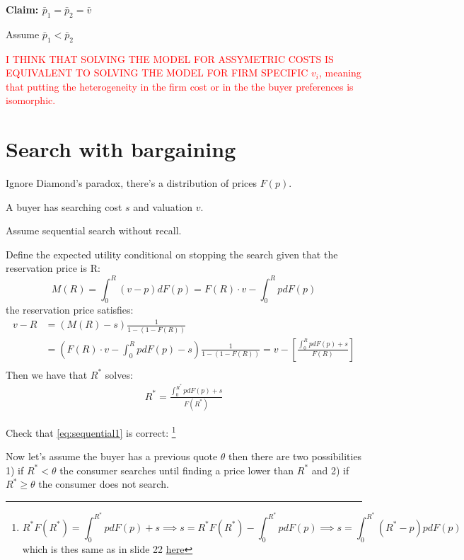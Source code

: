 \documentclass[12pt]{article}
\theoremstyle{plain}
\theoremstyle{plain}
\begin{document}
\vspace{2cm}

\textbf{Claim: $\bar{p}_1 =\bar{p}_2 =\bar{v}$ } 

Assume $\bar{p}_1 < \bar{p}_2$

\textcolor{red}{I THINK THAT SOLVING THE MODEL FOR ASSYMETRIC COSTS IS EQUIVALENT TO SOLVING THE MODEL FOR FIRM SPECIFIC $v_i$, meaning that putting the heterogeneity in the firm cost or in the the buyer preferences is isomorphic. }


\newpage 

\section{Search with bargaining}

Ignore Diamond's paradox, there's a distribution of prices $F(p)$. 

A buyer has searching cost $s$ and valuation $v$. 

Assume sequential search without recall. 

Define the expected utility conditional on stopping the search given that the reservation price is R: 
$$M(R) = \int_0^R (v-p)dF(p) = F(R)\cdot v - \int_0^R pdF(p)$$ 
the reservation price satisfies: 
\begin{align*}
        v-R &= (M(R)-s)\frac{1}{1-(1-F(R))} \\
   &= \left(F(R)\cdot v - \int_0^R pdF(p)-s\right)\frac{1}{1-(1-F(R))} = v - \left[\frac{\int_0^R pdF(p)+s}{F(R)}\right]\\
\end{align*}
Then we have that $R^*$ solves: 
\begin{align}\label{eq:sequential1}
        R^* = \frac{\int_0^{R^*} pdF(p)+s}{F(R^*)}
\end{align}

Check that \ref{eq:sequential1} is correct: 
\footnote{$$  R^*F(R^*) =  \int_0^{R^*} pdF(p)+s \implies s= R^*F(R^*) - \int_0^{R^*} pdF(p) \implies s= \int_0^{R^*} (R^*- p)  pdF(p) $$ which is thes same as in slide 22 \href{https://www.its.caltech.edu/~mshum/ec105/matt12.pdf}{here}}

Now let's assume the buyer has a previous quote $\theta$ then there are two possibilities 1) if $ R^*< \theta $ the consumer searches until finding a price lower than $R^*$ and 2) if $R^*\geq \theta$ the consumer does not search.




\end{document}
